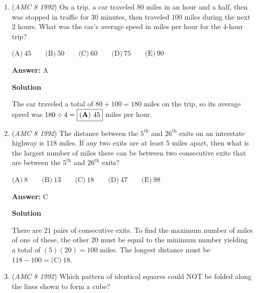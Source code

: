 \begin{enumerate}
$\text{(A)}\ 3 \qquad \text{(B)}\ 4 \qquad \text{(C)}\ 5 \qquad \text{(D)}\ 6 \qquad \text{(E)}\ 7$

 \textbf{Answer: }B



\textbf{Solution}

By the triangle inequality, $6.5 + s > 10$ and therefore $s > 3.5$. The smallest whole number $s$ that satisfies this inequality is $\boxed{\textbf{(B)}\ 4}$.

 


	\item (\textit{AMC 8 1992}) On a trip, a car traveled $80$ miles in an hour and a half, then was stopped in traffic for $30$ minutes, then traveled $100$ miles during the next $2$ hours.  What was the car's average speed in miles per hour for the $4$-hour trip?


 $\text{(A)}\ 45 \qquad \text{(B)}\ 50 \qquad \text{(C)}\ 60 \qquad \text{(D)}\ 75 \qquad \text{(E)}\ 90$

 \textbf{Answer: }A



\textbf{Solution}

The car traveled a total of $80 + 100 = 180$ miles on the trip, so its average speed was $180 \div 4 = \boxed{\text{(\textbf{A})}\ 45}$ miles per hour.

 


	\item (\textit{AMC 8 1992}) The distance between the $5^\text{th}$ and $26^\text{th}$ exits on an interstate highway is $118$ miles.  If any two exits are at least $5$ miles apart, then what is the largest number of miles there can be between two consecutive exits that are between the $5^\text{th}$ and $26^\text{th}$ exits?


 $\text{(A)}\ 8 \qquad \text{(B)}\ 13 \qquad \text{(C)}\ 18 \qquad \text{(D)}\ 47 \qquad \text{(E)}\ 98$

 \textbf{Answer: }C



\textbf{Solution}

There are $21$ pairs of consecutive exits. To find the maximum number of miles of one of these, the other $20$ must be equal to the minimum number yielding a total of $(5)(20)=100$ miles. The longest distance must be $118-100=\boxed{\text{(C)}\ 18}$.

 


	\item (\textit{AMC 8 1992}) Which pattern of identical squares could NOT be folded along the lines shown to form a cube?



\end{enumerate}
